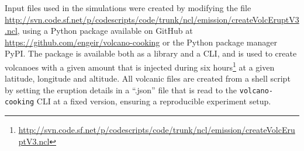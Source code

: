 \documentclass{ametsocV6.1}
\begin{document}
%






%



\appendix

\appendix[A]


Input files used in the simulations were created by modifying the file
\url{http://svn.code.sf.net/p/codescripts/code/trunk/ncl/emission/createVolcEruptV3.ncl},
using a Python package available on GitHub at
\url{https://github.com/engeir/volcano-cooking} or the Python package manager PyPI\@.
The package is available both as a library and a CLI, and is used to create volcanoes
with a given  amount that is injected during six
hours\footnote{\url{http://svn.code.sf.net/p/codescripts/code/trunk/ncl/emission/createVolcEruptV3.ncl}}
at a given latitude, longitude and altitude. All volcanic  files are created
from a shell script by setting the eruption details in a ``.json'' file that is read to
the \texttt{volcano-cooking} CLI at a fixed version, ensuring a reproducible experiment
setup.
\end{document}
